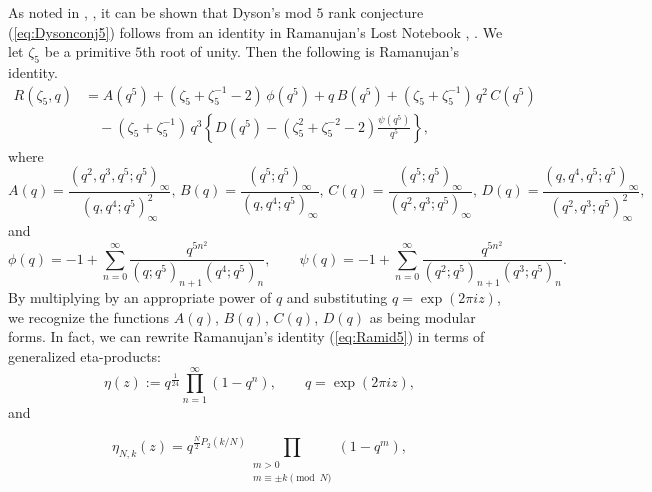 \documentclass[12pt]{amsart}
\theoremstyle{definition}
\theoremstyle{remark}
\numberwithin{equation}{section}
\newcommand\fpart[1]{\left\{#1\right\}}
\newcommand\eqn[1]{(\ref{eq:#1})}
\begin{document}
As noted in \cite{Ga88a}, \cite{Ga88b}, it can be shown that
Dyson's mod $5$ rank conjecture \eqn{Dysonconj5} follows from an identity
in Ramanujan's Lost Notebook \cite[p.20]{Ra1988}, \cite[Eq. (2.1.17)]{An-Be-RLNIII}.
We let $\zeta_5$ be a primitive $5$th root of unity. Then the
following is Ramanujan's identity.
\begin{align}
R(\zeta_5,q) &= A(q^5) + (\zeta_5 + \zeta_5^{-1}-2)\,\phi(q^5) + q\,B(q^5) + 
(\zeta_5+\zeta_5^{-1})\,q^2\,C(q^5)
\label{eq:Ramid5}\\
&\quad 
- (\zeta_5+\zeta_5^{-1})\,q^3\left\{D(q^5) - (\zeta_5^2 + \zeta_5^{-2}  - 2)\frac{\psi(q^5)}{q^5}
\right\},
\nonumber
\end{align}
where
$$
A(q) = \frac{(q^2,q^3,q^5;q^5)_\infty}{(q,q^4;q^5)_\infty^2},\,
B(q) = \frac{(q^5;q^5)_\infty}{(q,q^4;q^5)_\infty},\,
C(q) = \frac{(q^5;q^5)_\infty}{(q^2,q^3;q^5)_\infty},\,
D(q) = \frac{(q,q^4,q^5;q^5)_\infty}{(q^2,q^3;q^5)_\infty^2},
$$
and
$$
\phi(q) = -1 + \sum_{n=0}^\infty \frac{q^{5n^2}}{(q;q^5)_{n+1} (q^4;q^5)_n},\qquad
\psi(q) =  -1 + 
\sum_{n=0}^\infty \frac{q^{5n^2}}{(q^2;q^5)_{n+1} (q^3;q^5)_n}.
$$
By multiplying by an appropriate power of $q$ and
substituting $q=\exp(2\pi iz)$,
we recognize the functions $A(q)$, $B(q)$, $C(q)$, $D(q)$ 
as being modular forms.
In fact, we can rewrite Ramanujan's identity \eqn{Ramid5} in 
terms of generalized eta-products:
$$
\eta(z) := q^{\frac{1}{24}} \prod_{n=1}^\infty (1 - q^n),\qquad q=\exp(2\pi iz),
$$
and

\begin{equation}
\label{eq:Geta}
\eta_{N,k}(z) =q^{\frac{N}{2} P_2(k/N) }
\prod_{
       \substack{m>0 \\ m\equiv \pm k\pmod{N}}} (1 - q^m),
\end{equation}
\end{document}
